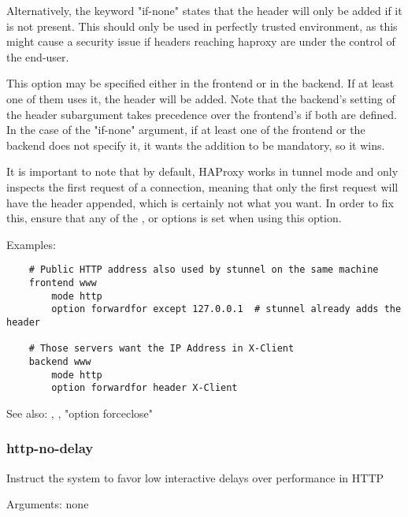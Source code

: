   Alternatively, the keyword "if-none" states that the header will only be
  added if it is not present. This should only be used in perfectly trusted
  environment, as this might cause a security issue if headers reaching haproxy
  are under the control of the end-user.

  This option may be specified either in the frontend or in the backend. If at
  least one of them uses it, the header will be added. Note that the backend's
  setting of the header subargument takes precedence over the frontend's if
  both are defined. In the case of the "if-none" argument, if at least one of
  the frontend or the backend does not specify it, it wants the addition to be
  mandatory, so it wins.

  It is important to note that by default, HAProxy works in tunnel mode and
  only inspects the first request of a connection, meaning that only the first
  request will have the header appended, which is certainly not what you want.
  In order to fix this, ensure that any of the ,  or
   options is set when using this option.

  Examples:
\begin{verbatim}
    # Public HTTP address also used by stunnel on the same machine
    frontend www
        mode http
        option forwardfor except 127.0.0.1  # stunnel already adds the header

    # Those servers want the IP Address in X-Client
    backend www
        mode http
        option forwardfor header X-Client
\end{verbatim}


See also: , ,
             "option forceclose"

\subsubsection[http-no-delay]{}
\subsubsection*{http-no-delay}


  Instruct the system to favor low interactive delays over performance in HTTP


  Arguments: none

